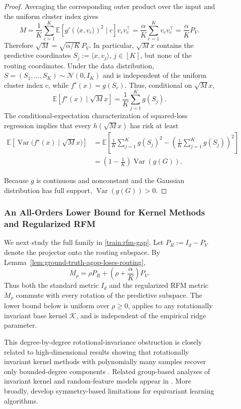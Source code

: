 \documentclass{article}
\newcounter{model}[section]
\begin{document}
\begin{figure}
\begin{proof}
Averaging the corresponding outer product over the input and the uniform
cluster index gives
\[
    M
    =\frac1K\sum_{c=1}^K
      \mathbb E\left[g'(\langle x,v_c\rangle)^2\mid c\right]v_cv_c^\top
    =\frac{\alpha}{K}\sum_{c=1}^K v_cv_c^\top
    =\frac{\alpha}{K}P_V.
\]
Therefore $\sqrt M=\sqrt{\alpha/K}\,P_V$. In particular, $\sqrt Mx$
contains the predictive coordinates
$S_j:=\langle x,v_j\rangle$, $j\in[K]$, but none of the routing coordinates.
Under the data distribution, $S=(S_1,\ldots,S_K)\sim\mathcal N(0,I_K)$ and is
independent of the uniform cluster index $c$, while
$f^\star(x)=g(S_c)$. Thus, conditional on $\sqrt Mx$,
\[
    \mathbb E[f^\star(x)\mid\sqrt Mx]
    =\frac1K\sum_{j=1}^K g(S_j).
\]
The conditional-expectation characterization of squared-loss regression
implies that every $h(\sqrt Mx)$ has risk at least
\begin{align*}
    \mathbb E\!\left[\operatorname{Var}
        \bigl(f^\star(x)\mid\sqrt Mx\bigr)\right]
    &=\mathbb E\!\left[
        \frac1K\sum_{j=1}^K g(S_j)^2
        -\left(\frac1K\sum_{j=1}^K g(S_j)\right)^2
      \right]\\
    &=\left(1-\frac1K\right)\operatorname{Var}(g(G)).
\end{align*}

Because $g$ is continuous and nonconstant and the Gaussian distribution has
full support, $\operatorname{Var}(g(G))>0$.

\end{proof}

\subsubsection{An All-Orders Lower Bound for Kernel Methods and Regularized RFM}

We next study the full family in \cref{train:rfm-gap}. Let
$P_R:=I_d-P_V$ denote the projector onto the routing subspace. By
Lemma~\ref{lem:ground-truth-agop-loses-routing},
\[
    M_\rho
    =\rho P_R+\left(\rho+\frac{\alpha}{K}\right)P_V.
\]
Thus both the standard metric $I_d$ and the regularized RFM metric $M_\rho$
commute with every rotation of the predictive subspace. The lower bound below
is uniform over $\rho\geq0$, applies to any rotationally invariant base kernel
$\mathcal K$, and is independent of the empirical ridge parameter. 

This degree-by-degree rotational-invariance obstruction is closely related to
high-dimensional results showing that rotationally invariant kernel methods
with polynomially many samples recover only bounded-degree components
\citep{ghorbani2021linearized,ghorbani2020outperform}.
Related group-based analyses of invariant kernel and random-feature models
appear in \citet{mei2021invariances}. More broadly,
\citet{abbe2022nonuniversality} develop symmetry-based limitations for
equivariant learning algorithms.



\end{figure}
\end{document}
